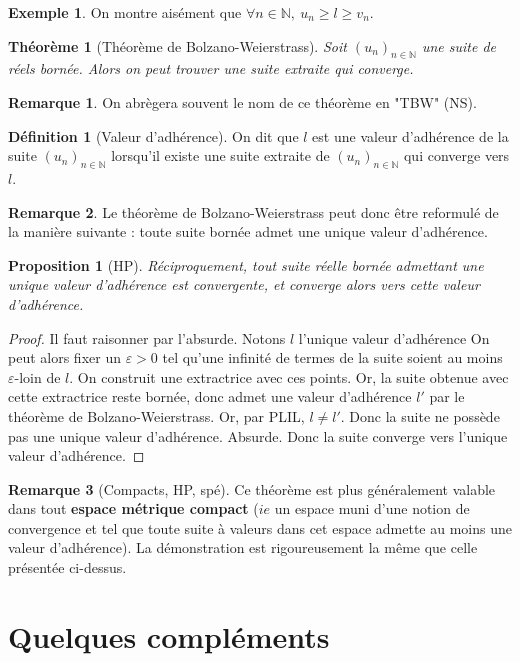 \documentclass[french]{book}
\newcommand{\N}{\mathbb{N}}
\theoremstyle{plain}
\newtheorem{thm}{Théorème}[chapter]
\newtheorem{prop}{Proposition}[chapter]
\theoremstyle{definition}
\newtheorem{dfn}{Définition}[chapter]
\newtheorem{exa}{Exemple}[chapter]
\newtheorem{rmq}{Remarque}[chapter]
\theoremstyle{remark}
\begin{document}
\begin{exa}
	On montre aisément que $\forall n\in\N,\ u_n\geqslant l\geqslant v_n$.
\end{exa}
\begin{thm}[Théorème de Bolzano-Weierstrass]
	Soit $(u_n)_{n\in\N}$ une suite de réels bornée. Alors on peut trouver une suite extraite qui converge.
\end{thm}
\begin{rmq}
	On abrègera souvent le nom de ce théorème en "TBW" (NS).
\end{rmq}
\begin{dfn}[Valeur d'adhérence]
	On dit que $l$ est une valeur d'adhérence de la suite $(u_n)_{n\in\N}$ lorsqu'il existe une suite extraite de $(u_n)_{n\in\N}$ qui converge vers $l$.
\end{dfn}
\begin{rmq}
	Le théorème de Bolzano-Weierstrass peut donc être reformulé de la manière suivante : toute suite bornée admet une unique valeur d'adhérence.
\end{rmq}
\begin{prop}[HP]
	Réciproquement, tout suite réelle bornée admettant une unique valeur d'adhérence est convergente, et converge alors vers cette valeur d'adhérence.
\end{prop}
\begin{proof}
	Il faut raisonner par l'absurde. Notons $l$ l'unique valeur d'adhérence On peut alors fixer un $\varepsilon>0$ tel qu'une infinité de termes de la suite soient au moins $\varepsilon$-loin de $l$. On construit une extractrice avec ces points. Or, la suite obtenue avec cette extractrice reste bornée, donc admet une valeur d'adhérence $l'$ par le théorème de Bolzano-Weierstrass. Or, par PLIL, $l\ne l'$. Donc la suite ne possède pas une unique valeur d'adhérence. Absurde. Donc la suite converge vers l'unique valeur d'adhérence.
\end{proof}
\begin{rmq}[Compacts, HP, spé]
	Ce théorème est plus généralement valable dans tout \textbf{espace métrique compact} ($ie$ un espace muni d'une notion de convergence et tel que toute suite à valeurs dans cet espace admette au moins une valeur d'adhérence). La démonstration est rigoureusement la même que celle présentée ci-dessus.
\end{rmq}
\section{Quelques compléments}
\end{document}
